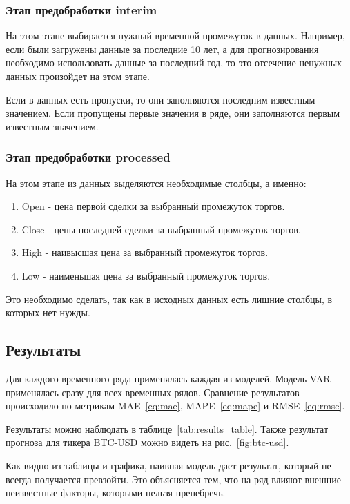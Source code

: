 \documentclass[a4paper,article,14pt]{extarticle}
\begin{document}
\subsubsection{Этап предобработки interim}
На этом этапе выбирается нужный временной промежуток в данных.
Например, если были загружены данные за последние 10 лет, а для прогнозирования необходимо использовать данные за последний год, то это отсечение ненужных данных произойдет на этом этапе.
\par

Если в данных есть пропуски, то они заполняются последним известным значением.
Если пропущены первые значения в ряде, они заполняются первым известным значением.

\subsubsection{Этап предобработки processed}

На этом этапе из данных выделяются необходимые столбцы, а именно:
\begin{enumerate}
    \item Open - цена первой сделки за выбранный промежуток торгов.
    \item Close - цены последней сделки за выбранный промежуток торгов.
    \item High - наивысшая цена за выбранный промежуток торгов.
    \item Low - наименьшая цена за выбранный промежуток торгов.
\end{enumerate}
\par

Это необходимо сделать, так как в исходных данных есть лишние столбцы, в которых нет нужды.

\subsection{Результаты}
Для каждого временного ряда применялась каждая из моделей.
Модель VAR применялась сразу для всех временных рядов.
Сравнение результатов происходило по метрикам MAE~\eqref{eq:mae}, MAPE~\eqref{eq:mape} и RMSE~\eqref{eq:rmse}.

Результаты можно наблюдать в таблице~\ref{tab:results_table}.
Также результат прогноза для тикера BTC-USD можно видеть на рис.~\ref{fig:btc-usd}.
\pagebreak



Как видно из таблицы и графика, наивная модель дает результат, который не всегда получается превзойти.
Это объясняется тем, что на ряд влияют внешние неизвестные факторы, которыми нельзя пренебречь.
\end{document}
